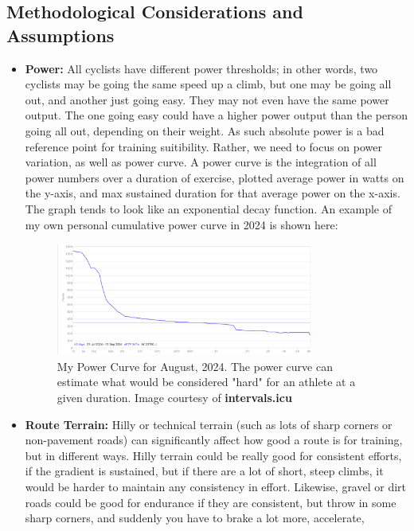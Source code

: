 \documentclass[11pt,a4paper]{report}
\begin{document}
\subsection{Methodological Considerations and Assumptions}
\begin{itemize}
	\item \textbf{Power:} All cyclists have different power thresholds; in other words, two cyclists may be going the same speed up a climb, but one may be going all out, and another just going easy.
	      They may not even have the same power output. The one going easy could have a higher power output than the person going all out, depending on their weight. As such absolute power is a bad reference
	      point for training suitibility. Rather, we need to focus on power variation, as well as power curve. A power curve is the integration of all power numbers over a duration of exercise, plotted average power in watts on the y-axis,
	      and max sustained duration for that average power on the x-axis. The graph tends to look like an exponential decay function. An example of my own personal cumulative power curve in 2024 is shown here:
	      \begin{figure}[h!]
		      \centering
		      \includegraphics[width=0.8\textwidth]{jibb_powercurve.png}
		      \caption{My Power Curve for August, 2024. The power curve can estimate what would be considered "hard" for an athlete at a given duration. Image courtesy of \textbf{intervals.icu}}
	      \end{figure}
	\item \textbf{Route Terrain:} Hilly or technical terrain (such as lots of sharp corners or non-pavement roads) can significantly affect how good a route is for training, but
	      in different ways. Hilly terrain could be really good for consistent efforts, if the gradient is sustained, but if there are a lot of short, steep climbs, it would be harder to maintain
	      any consistency in effort. Likewise, gravel or dirt roads could be good for endurance if they are consistent, but throw in some sharp corners, and suddenly you have to brake a lot more, accelerate,

\end{itemize}
\end{document}
